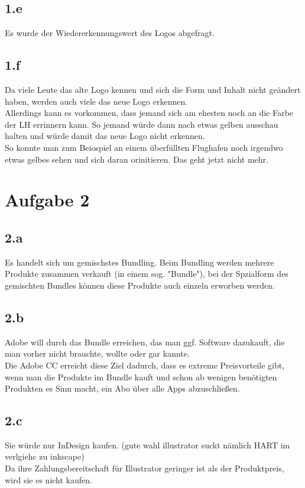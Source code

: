\subsection{1.e}
    Es wurde der Wiedererkennungswert des Logos abgefragt.

\subsection{1.f}
    Da viele Leute das alte Logo kennen und sich die Form und Inhalt nicht geändert haben, werden auch viele das neue Logo erkennen. \\
    Allerdings kann es vorkommen, dass jemand sich am ehesten noch an die Farbe der LH errinnern kann. So jemand würde dann nach etwas gelben ausschau halten und würde damit das neue Logo nicht erkennen. \\
    So konnte man zum Beiospiel an einem überfüllten Flughafen noch irgendwo etwas gelbes sehen und sich daran orinitieren. Das geht jetzt nicht mehr. 



\section{Aufgabe 2}
\subsection{2.a}
    Es handelt sich um gemischstes Bundling. Beim Bundling werden mehrere Produkte zusammen verkauft (in einem sog. "Bundle"), bei der Spzialform des gemischten Bundles können diese Produkte auch einzeln erworben werden. \\

\subsection{2.b}
    Adobe will durch das Bundle erreichen, das man ggf. Software dazukauft, die man vorher nicht brauchte, wollte oder gar kannte. \\
    Die Adobe CC erreicht diese Ziel dadurch, dass es extreme Preisvorteile gibt, wenn man die Produkte im Bundle kauft und schon ab wenigen benötigten Produkten es Sinn macht, ein Abo über alle Apps abzuschließen.
    
\subsection{2.c}
    Sie würde nur InDesign kaufen. (gute wahl illustrator suckt nämlich HART im verlgiehc zu inkscape) \\
    Da ihre Zahlungsbereitschaft für Illustrator geringer ist als der Produktpreis, wird sie es nicht kaufen.

